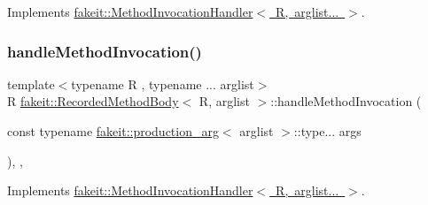 Implements \mbox{\hyperlink{structfakeit_1_1MethodInvocationHandler_a6ef3fe1e948c1886a085bd948d61f730}{fakeit\+::\+Method\+Invocation\+Handler$<$ R, arglist... $>$}}.

\mbox{\label{classfakeit_1_1RecordedMethodBody_a7ba17fdfe96f573c1d3992433a50d170}} 
\subsubsection{\texorpdfstring{handleMethodInvocation()}{handleMethodInvocation()}\hspace{0.1cm}{\footnotesize\ttfamily [3/9]}}
{\footnotesize\ttfamily template$<$typename R , typename ... arglist$>$ \\
R \mbox{\hyperlink{classfakeit_1_1RecordedMethodBody}{fakeit\+::\+Recorded\+Method\+Body}}$<$ R, arglist $>$\+::handle\+Method\+Invocation (\begin{DoxyParamCaption}\item[{const typename \mbox{\hyperlink{structfakeit_1_1production__arg}{fakeit\+::production\+\_\+arg}}$<$ arglist $>$\+::type...}]{args }\end{DoxyParamCaption})\hspace{0.3cm}{\ttfamily [inline]}, {\ttfamily [override]}, {\ttfamily [virtual]}}



Implements \mbox{\hyperlink{structfakeit_1_1MethodInvocationHandler_a6ef3fe1e948c1886a085bd948d61f730}{fakeit\+::\+Method\+Invocation\+Handler$<$ R, arglist... $>$}}.

\mbox{\label{classfakeit_1_1RecordedMethodBody_a7ba17fdfe96f573c1d3992433a50d170}} 
